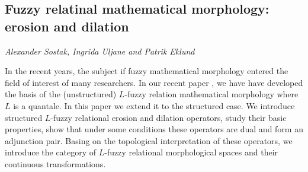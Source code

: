\documentclass[../booklet.tex]{subfiles}
\begin{document}
\subsection[Fuzzy relatinal mathematical morphology: erosion and dilation. {\it Alexander Sostak, Ingrida Uljane and Patrik Eklund}]{Fuzzy relatinal mathematical morphology: erosion and dilation}
  

\begin{center}
  {\it Alexander Sostak, Ingrida Uljane and Patrik Eklund}
\end{center}

\vskip 0.8cm

 In the recent years, the subject if fuzzy mathematical morphology entered the field of interest of many researchers. In our recent paper \cite{SoUl1}, we have have developed the basis of the (unstructured) $L$-fuzzy relation mathematical morphology where $L$ is a quantale. In this paper we extend  it to the structured case. We introduce structured $L$-fuzzy relational erosion and dilation operators, study their basic properties, show that under some conditions  these operators are dual and form an adjunction pair. Basing on the topological interpretation of these operators, we introduce the category of  $L$-fuzzy relational morphological spaces and their continuous transformations. 


\end{document}
